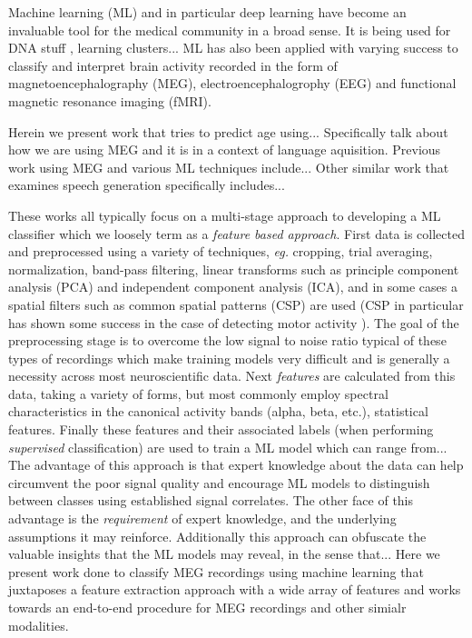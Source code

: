 \documentclass[utf8]{frontiersSCNS} %
\begin{document}
Machine learning (ML) and in particular deep learning have become an invaluable tool for the medical community in a broad sense. It is being used for DNA stuff \cite{}, learning clusters... ML has also been applied with varying success to classify and interpret brain activity recorded in the form of magnetoencephalography (MEG), electroencephalogrophy (EEG) and functional magnetic resonance imaging (fMRI).

Herein we present work that tries to predict age using... Specifically talk about how we are using MEG and it is in a context of language aquisition. Previous work using MEG and various ML techniques include... Other similar work that examines speech generation specifically includes...

These works all typically focus on a multi-stage approach to developing a ML classifier which we loosely term as a \emph{feature based approach}. First data is collected and preprocessed using a variety of techniques, \emph{eg.} cropping, trial averaging, normalization, band-pass filtering, linear transforms such as principle component analysis (PCA) and independent component analysis (ICA), and in some cases a spatial filters such as common spatial patterns (CSP) are used (CSP in particular has shown some success in the case of detecting motor activity \cite{}). The goal of the preprocessing stage is to overcome the low signal to noise ratio typical of these types of recordings which make training models very difficult and is generally a necessity across most neuroscientific data. Next \emph{features} are calculated from this data, taking a variety of forms, but  most commonly employ spectral characteristics in the canonical activity bands (alpha, beta, etc.), statistical features. Finally these features and their associated labels (when performing \emph{supervised} classification) are used to train a ML model which can range from... The advantage of this approach is that expert knowledge about the data can help circumvent the poor signal quality and encourage ML models to distinguish between classes using established signal correlates. The other face of this advantage is the \emph{requirement} of expert knowledge, and the underlying assumptions it may reinforce. Additionally this approach can obfuscate the valuable insights that the ML models may reveal, in the sense that... Here we present work done to classify MEG recordings using machine learning that juxtaposes a feature extraction approach with a wide array of features and works towards an end-to-end procedure for MEG recordings and other simialr modalities.
\end{document}

